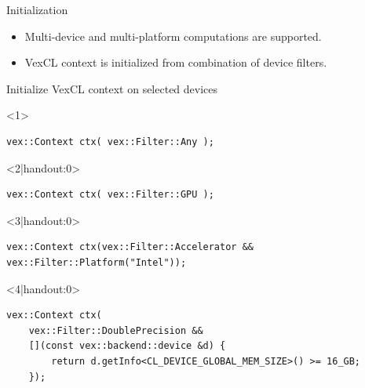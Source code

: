 \documentclass[@BEAMER_OPTIONS@]{beamer}
\begin{document}
\begin{frame}[fragile]{Initialization}
    \begin{itemize}
        \item Multi-device and multi-platform computations are supported.
        \item VexCL context is initialized from combination of device filters.
    \end{itemize}
    \vspace{-0.5\baselineskip}
    \begin{overlayarea}{\textwidth}{0.4\textheight}
    \begin{exampleblock}{Initialize VexCL context on selected devices}
        \begin{onlyenv}<1>
        \begin{lstlisting}
vex::Context ctx( vex::Filter::Any );
        \end{lstlisting}
        \end{onlyenv}
        \begin{onlyenv}<2|handout:0>
        \begin{lstlisting}
vex::Context ctx( vex::Filter::GPU );
        \end{lstlisting}
        \end{onlyenv}
        \begin{onlyenv}<3|handout:0>
        \begin{lstlisting}
vex::Context ctx(vex::Filter::Accelerator && vex::Filter::Platform("Intel"));
        \end{lstlisting}
        \end{onlyenv}
        \begin{onlyenv}<4|handout:0>
        \begin{lstlisting}
vex::Context ctx(
    vex::Filter::DoublePrecision &&
    [](const vex::backend::device &d) {
        return d.getInfo<CL_DEVICE_GLOBAL_MEM_SIZE>() >= 16_GB;
    });
        \end{lstlisting}
        \end{onlyenv}
    \end{exampleblock}
    \end{overlayarea}
    \begin{figure}
\end{figure}
\end{frame}
\end{document}
